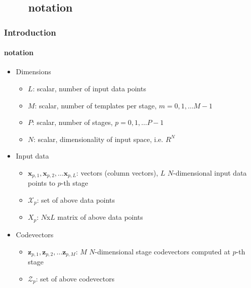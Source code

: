 \subsection{\ \ \ \ notation}
\begin{frame}
\frametitle{Introduction}
\framesubtitle{notation}
\logoCSIPCPL\mypagenum
	\begin{itemize}\tiny
		\item Dimensions
			\begin{itemize}\tiny
				\item {\color{red}$L$}: scalar, number of input data points
				\item {\color{red}$M$}: scalar, number of templates per stage, $m=0, 1, \ldots M-1$
				\item {\color{red}$P$}: scalar, number of stages, $p=0, 1, \ldots P-1$
				\item {\color{red}$N$}: scalar, dimensionality of input space, i.e. $R^N$
			\end{itemize}
		\item Input data
			\begin{itemize}\tiny
				\item {\color{red}$\mathbf{x}_{p,1}, \mathbf{x}_{p,2}, \ldots \mathbf{x}_{p, L}$}: vectors (column vectors), $L$ $N$-dimensional input data points to $p$-th stage
				\item {\color{red}$\mathcal{X}_p$}: set of above data points
				\item {\color{red}$X_p$}: $N$x$L$ matrix of above data points
			\end{itemize}
		\item Codevectors
			\begin{itemize}\tiny
				\item {\color{red}$\mathbf{z}_{p, 1}, \mathbf{z}_{p, 2},\ldots \mathbf{z}_{p, M}$}: $M$ $N$-dimensional stage codevectors computed at $p$-th stage
				\item {\color{red}$\mathcal{Z}_p$}: set of above codevectors 
			\end{itemize}

\end{itemize}
\end{frame}
